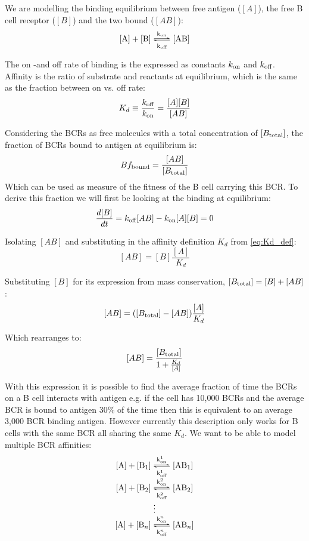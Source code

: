 We are modelling the binding equilibrium between free antigen ($[A]$), the free B cell receptor ($[B]$) and the two bound ($[AB]$):
\begin{equation}
\ce{[A] + [B] <=>[k_{\on}][k_{\off}] [AB]}
  \label{eq:bind1}
\end{equation}

\noindent
The on -and off rate of binding is the expressed as constants $k_{\text{on}}$ and $k_{\text{off}}$. Affinity is the ratio of substrate and reactants at equilibrium, which is the same as the fraction between on vs. off rate:
\begin{equation}
K_d \equiv \frac{k_{\text{off}}}{k_{\text{on}}} = \frac{[A] [B]}{[AB]}
  \label{eq:Kd_def}
\end{equation}

\noindent
Considering the BCRs as free molecules with a total concentration of $[B_{\text{total}}]$, the fraction of BCRs bound to antigen at equilibrium is:
$$
Bf_{\text{bound}} = \frac{[AB]}{[B_{\text{total}}]}
$$
Which can be used as measure of the fitness of the B cell carrying this BCR.
To derive this fraction we will first be looking at the binding at equilibrium:
\begin{equation}
\frac{d[B]}{dt} = k_{\text{off}} [AB] - k_{\text{on}} [A] [B] = 0
  \label{eq:equilibrium}
\end{equation}

\noindent
Isolating $[AB]$ and substituting in the affinity definition $K_d$ from \ref{eq:Kd_def}:
$$
[AB] = [B] \frac{[A]}{K_d}
$$

\noindent
Substituting $[B]$ for its expression from mass conservation, $[B_{\text{total}}] = [B] + [AB]$:
$$
[AB] = ([B_{\text{total}}] - [AB]) \frac{[A]}{K_d}
$$

\noindent
Which rearranges to:
$$ 
[AB] = \frac{[B_{\text{total}}]}{1 + \frac{K_d}{[A]}}
$$

\noindent
With this expression it is possible to find the average fraction of time the BCRs on a B cell interacts with antigen e.g. if the cell has 10,000 BCRs and the average BCR is bound to antigen 30\% of the time then this is equivalent to an average 3,000 BCR binding antigen.
However currently this description only works for B cells with the same BCR all sharing the same $K_d$.
We want to be able to model multiple BCR affinities:
\[
 \begin{matrix}
  \ce{[A] + [B_1] <=>[k^1_{\on}][k^1_{\off}] [AB_1]} \\
  \ce{[A] + [B_2] <=>[k^2_{\on}][k^2_{\off}] [AB_2]} \\
  \vdots \\ 
  \ce{[A] + [B_n] <=>[k^n_{\on}][k^n_{\off}] [AB_n]}
 \end{matrix}
\]

